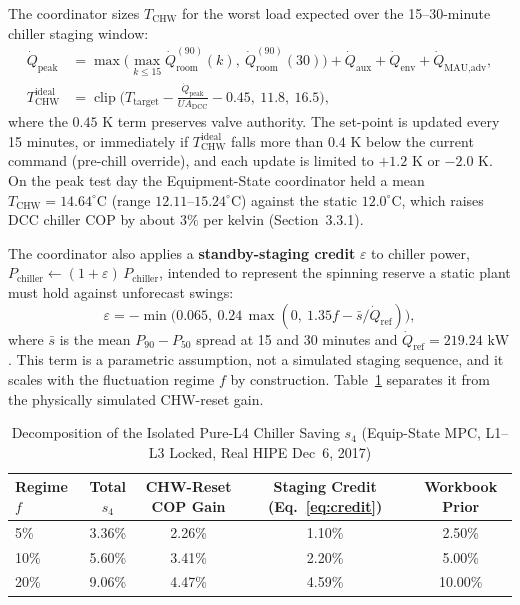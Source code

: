 The coordinator sizes $T_{\text{CHW}}$ for the worst load expected over the 15--30-minute chiller staging window:
\begin{align}
\dot{Q}_{\text{peak}} &= \max\!\Big(\max_{k \le 15}\dot{Q}^{(90)}_{\text{room}}(k),\ \dot{Q}^{(90)}_{\text{room}}(30)\Big) + \dot{Q}_{\text{aux}} + \dot{Q}_{\text{env}} + \dot{Q}_{\text{MAU,adv}}, \nonumber\\
T_{\text{CHW}}^{\text{ideal}} &= \operatorname{clip}\!\Big(T_{\text{target}} - \frac{\dot{Q}_{\text{peak}}}{UA_{\text{DCC}}} - 0.45,\ 11.8,\ 16.5\Big),
\label{eq:chw}
\end{align}
where the $0.45\text{ K}$ term preserves valve authority. The set-point is updated every 15 minutes, or immediately if $T_{\text{CHW}}^{\text{ideal}}$ falls more than $0.4\text{ K}$ below the current command (pre-chill override), and each update is limited to $+1.2\text{ K}$ or $-2.0\text{ K}$. On the peak test day the Equipment-State coordinator held a mean $T_{\text{CHW}} = 14.64^\circ\text{C}$ (range $12.11$--$15.24^\circ\text{C}$) against the static $12.0^\circ\text{C}$, which raises DCC chiller COP by about $3\%$ per kelvin (Section~3.3.1).

The coordinator also applies a \textbf{standby-staging credit} $\varepsilon$ to chiller power, $P_{\text{chiller}} \leftarrow (1 + \varepsilon)\,P_{\text{chiller}}$, intended to represent the spinning reserve a static plant must hold against unforecast swings:
\begin{equation}
\varepsilon = -\min\!\big(0.065,\ 0.24\,\max(0,\ 1.35f - \bar{s}/\dot{Q}_{\text{ref}})\big),
\label{eq:credit}
\end{equation}
where $\bar{s}$ is the mean $P_{90} - P_{50}$ spread at 15 and 30 minutes and $\dot{Q}_{\text{ref}} = 219.24\text{ kW}$. This term is a parametric assumption, not a simulated staging sequence, and it scales with the fluctuation regime $f$ by construction. Table~\ref{tab:l4_decomp} separates it from the physically simulated CHW-reset gain.

\begin{table}[htbp]
\centering
\caption{Decomposition of the Isolated Pure-L4 Chiller Saving $s_4$ (Equip-State MPC, L1--L3 Locked, Real HIPE Dec~6, 2017)}
\label{tab:l4_decomp}
\small
\begin{tabular}{@{}lcccc@{}}
\toprule
\textbf{Regime $f$} & \textbf{Total $s_4$} & \textbf{CHW-Reset COP Gain} & \textbf{Staging Credit (Eq.~\ref{eq:credit})} & \textbf{Workbook Prior} \\
\midrule
5\%  & 3.36\% & 2.26\% & 1.10\% & 2.50\% \\
10\% & 5.60\% & 3.41\% & 2.20\% & 5.00\% \\
20\% & 9.06\% & 4.47\% & 4.59\% & 10.00\% \\
\bottomrule
\end{tabular}
\end{table}

